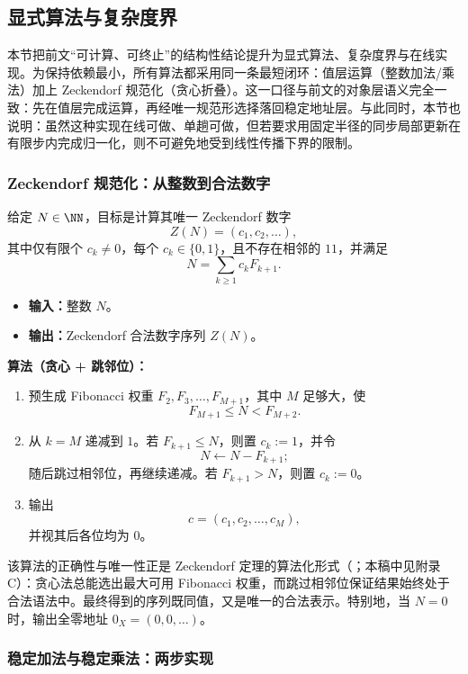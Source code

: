 \subsection{显式算法与复杂度界}\label{subsec:zeckendorf-algorithms-complexity}

本节把前文“可计算、可终止”的结构性结论提升为显式算法、复杂度界与在线实现。为保持依赖最小，所有算法都采用同一条最短闭环：值层运算（整数加法/乘法）加上 Zeckendorf 规范化（贪心折叠）。这一口径与前文的对象层语义完全一致：先在值层完成运算，再经唯一规范形选择落回稳定地址层。与此同时，本节也说明：虽然这种实现在线可做、单趟可做，但若要求用固定半径的同步局部更新在有限步内完成归一化，则不可避免地受到线性传播下界的限制。

\subsubsection{Zeckendorf 规范化：从整数到合法数字}

给定 \(N\in \NN\)，目标是计算其唯一 Zeckendorf 数字
\[
Z(N)=(c_1,c_2,\dots),
\]
其中仅有限个 \(c_k\neq 0\)，每个 \(c_k\in\{0,1\}\)，且不存在相邻的 \(11\)，并满足
\[
N=\sum_{k\ge 1} c_kF_{k+1}.
\]

\begin{itemize}
  \item \textbf{输入：}整数 \(N\)。
  \item \textbf{输出：}Zeckendorf 合法数字序列 \(Z(N)\)。
\end{itemize}

\textbf{算法（贪心 + 跳邻位）：}
\begin{enumerate}
  \item 预生成 Fibonacci 权重 \(F_2,F_3,\dots,F_{M+1}\)，其中 \(M\) 足够大，使
  \[
  F_{M+1}\le N<F_{M+2}.
  \]
  \item 从 \(k=M\) 递减到 \(1\)。若 \(F_{k+1}\le N\)，则置 \(c_k:=1\)，并令
  \[
  N\leftarrow N-F_{k+1};
  \]
  随后跳过相邻位，再继续递减。若 \(F_{k+1}>N\)，则置 \(c_k:=0\)。
  \item 输出
  \[
  c=(c_1,c_2,\dots,c_M),
  \]
  并视其后各位均为 \(0\)。
\end{enumerate}

该算法的正确性与唯一性正是 Zeckendorf 定理的算法化形式（\cite{Zeckendorf1972}；本稿中见附录 C）：贪心法总能选出最大可用 Fibonacci 权重，而跳过相邻位保证结果始终处于合法语法中。最终得到的序列既同值，又是唯一的合法表示。特别地，当 \(N=0\) 时，输出全零地址 \(0_X=(0,0,\dots)\)。

\subsubsection{稳定加法与稳定乘法：两步实现}


